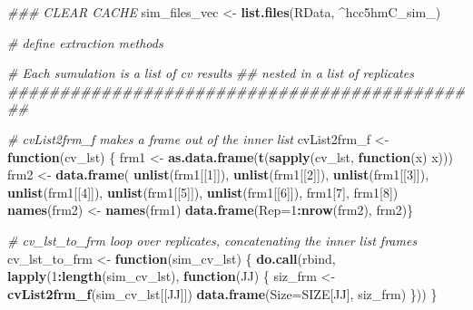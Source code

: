 \documentclass[
]{book}
\newenvironment{Shaded}{\begin{snugshade}}{\end{snugshade}}
\newcommand{\CommentTok}[1]{\textcolor[rgb]{0.56,0.35,0.01}{\textit{#1}}}
\newcommand{\ControlFlowTok}[1]{\textcolor[rgb]{0.13,0.29,0.53}{\textbf{#1}}}
\newcommand{\DataTypeTok}[1]{\textcolor[rgb]{0.13,0.29,0.53}{#1}}
\newcommand{\DecValTok}[1]{\textcolor[rgb]{0.00,0.00,0.81}{#1}}
\newcommand{\KeywordTok}[1]{\textcolor[rgb]{0.13,0.29,0.53}{\textbf{#1}}}
\newcommand{\NormalTok}[1]{#1}
\newcommand{\OperatorTok}[1]{\textcolor[rgb]{0.81,0.36,0.00}{\textbf{#1}}}
\newcommand{\StringTok}[1]{\textcolor[rgb]{0.31,0.60,0.02}{#1}}
\begin{document}
\begin{Shaded}
\begin{Highlighting}[]
\CommentTok{\#\#\# CLEAR CACHE}
\NormalTok{sim\_files\_vec <{-}}\StringTok{ }\KeywordTok{list.files}\NormalTok{(}\StringTok{\textquotesingle{}RData\textquotesingle{}}\NormalTok{, }\StringTok{\textquotesingle{}\^{}hcc5hmC\_sim\_\textquotesingle{}}\NormalTok{)}


\CommentTok{\# define extraction methods}

\CommentTok{\# Each sumulation is a list of cv results }
\CommentTok{\#\# nested in a list of replicates}
\CommentTok{\#\#\#\#\#\#\#\#\#\#\#\#\#\#\#\#\#\#\#\#\#\#\#\#\#\#\#\#\#\#\#\#\#\#\#\#\#\#\#\#\#\#\#\#\#\#}

\CommentTok{\# cvList2frm\_f makes a frame out of the inner list}
\NormalTok{cvList2frm\_f <{-}}\StringTok{ }\ControlFlowTok{function}\NormalTok{(cv\_lst) \{}
\NormalTok{ frm1 <{-}}\StringTok{ }\KeywordTok{as.data.frame}\NormalTok{(}\KeywordTok{t}\NormalTok{(}\KeywordTok{sapply}\NormalTok{(cv\_lst, }\ControlFlowTok{function}\NormalTok{(x) x)))}
\NormalTok{ frm2 <{-}}\StringTok{ }\KeywordTok{data.frame}\NormalTok{(}
  \KeywordTok{unlist}\NormalTok{(frm1[[}\DecValTok{1}\NormalTok{]]), }\KeywordTok{unlist}\NormalTok{(frm1[[}\DecValTok{2}\NormalTok{]]),}
  \KeywordTok{unlist}\NormalTok{(frm1[[}\DecValTok{3}\NormalTok{]]), }\KeywordTok{unlist}\NormalTok{(frm1[[}\DecValTok{4}\NormalTok{]]),}
  \KeywordTok{unlist}\NormalTok{(frm1[[}\DecValTok{5}\NormalTok{]]), }\KeywordTok{unlist}\NormalTok{(frm1[[}\DecValTok{6}\NormalTok{]]),}
\NormalTok{  frm1[}\DecValTok{7}\NormalTok{], frm1[}\DecValTok{8}\NormalTok{])}
  \KeywordTok{names}\NormalTok{(frm2) <{-}}\StringTok{ }\KeywordTok{names}\NormalTok{(frm1)}
  \KeywordTok{data.frame}\NormalTok{(}\DataTypeTok{Rep=}\DecValTok{1}\OperatorTok{:}\KeywordTok{nrow}\NormalTok{(frm2), frm2)\}}

\CommentTok{\# cv\_lst\_to\_frm loop over replicates, concatenating the inner list frames}
\NormalTok{cv\_lst\_to\_frm <{-}}\StringTok{ }\ControlFlowTok{function}\NormalTok{(sim\_cv\_lst) \{}
 \KeywordTok{do.call}\NormalTok{(}\StringTok{\textquotesingle{}rbind\textquotesingle{}}\NormalTok{, }\KeywordTok{lapply}\NormalTok{(}\DecValTok{1}\OperatorTok{:}\KeywordTok{length}\NormalTok{(sim\_cv\_lst),}
  \ControlFlowTok{function}\NormalTok{(JJ) \{}
\NormalTok{    siz\_frm <{-}}\StringTok{ }\KeywordTok{cvList2frm\_f}\NormalTok{(sim\_cv\_lst[[JJ]])}
    \KeywordTok{data.frame}\NormalTok{(}\DataTypeTok{Size=}\NormalTok{SIZE[JJ], siz\_frm)}
\NormalTok{  \}))}
\NormalTok{\}}


\end{Highlighting}
\end{Shaded}
\end{document}
